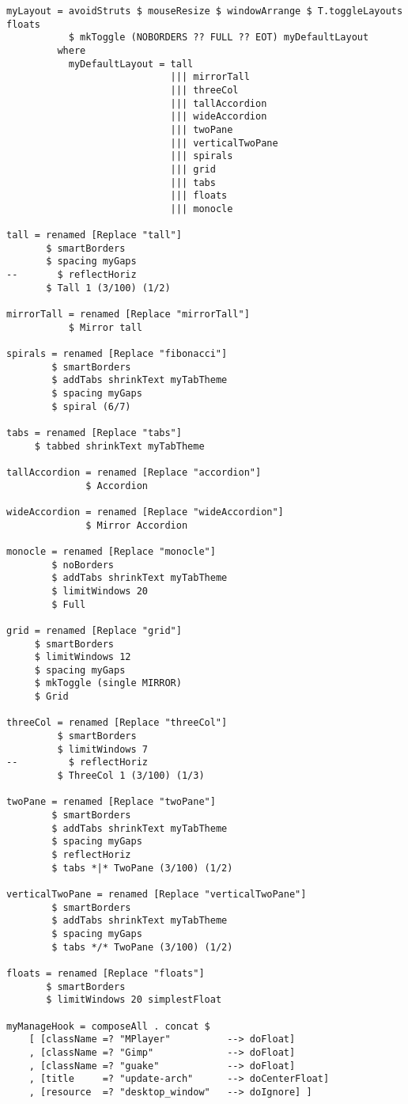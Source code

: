 \documentclass[11pt]{article}
\begin{document}
\begin{verbatim}
myLayout = avoidStruts $ mouseResize $ windowArrange $ T.toggleLayouts floats
           $ mkToggle (NOBORDERS ?? FULL ?? EOT) myDefaultLayout
         where
           myDefaultLayout = tall 
                             ||| mirrorTall
                             ||| threeCol
                             ||| tallAccordion
                             ||| wideAccordion
                             ||| twoPane
                             ||| verticalTwoPane
                             ||| spirals
                             ||| grid
                             ||| tabs
                             ||| floats
                             ||| monocle

tall = renamed [Replace "tall"] 
       $ smartBorders
       $ spacing myGaps
--       $ reflectHoriz
       $ Tall 1 (3/100) (1/2)

mirrorTall = renamed [Replace "mirrorTall"]
           $ Mirror tall

spirals = renamed [Replace "fibonacci"] 
        $ smartBorders
        $ addTabs shrinkText myTabTheme
        $ spacing myGaps 
        $ spiral (6/7)

tabs = renamed [Replace "tabs"]
     $ tabbed shrinkText myTabTheme

tallAccordion = renamed [Replace "accordion"]
              $ Accordion

wideAccordion = renamed [Replace "wideAccordion"]
              $ Mirror Accordion

monocle = renamed [Replace "monocle"]
        $ noBorders
        $ addTabs shrinkText myTabTheme
        $ limitWindows 20
        $ Full

grid = renamed [Replace "grid"]
     $ smartBorders
     $ limitWindows 12
     $ spacing myGaps
     $ mkToggle (single MIRROR)
     $ Grid 

threeCol = renamed [Replace "threeCol"]
         $ smartBorders
         $ limitWindows 7
--         $ reflectHoriz
         $ ThreeCol 1 (3/100) (1/3) 

twoPane = renamed [Replace "twoPane"]
        $ smartBorders
        $ addTabs shrinkText myTabTheme
        $ spacing myGaps
        $ reflectHoriz
        $ tabs *|* TwoPane (3/100) (1/2)  
  
verticalTwoPane = renamed [Replace "verticalTwoPane"]
        $ smartBorders
        $ addTabs shrinkText myTabTheme
        $ spacing myGaps
        $ tabs */* TwoPane (3/100) (1/2)  

floats = renamed [Replace "floats"]
       $ smartBorders
       $ limitWindows 20 simplestFloat

myManageHook = composeAll . concat $
    [ [className =? "MPlayer"          --> doFloat]
    , [className =? "Gimp"             --> doFloat]
    , [className =? "guake"            --> doFloat]
    , [title     =? "update-arch"      --> doCenterFloat]
    , [resource  =? "desktop_window"   --> doIgnore] ]

\end{verbatim}
\end{document}
